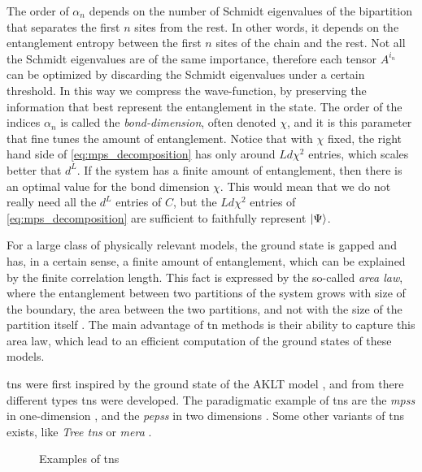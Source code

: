 The order of $\alpha_n$ depends on the number of Schmidt eigenvalues of the bipartition that separates the first $n$ sites from the rest.
In other words, it depends on the entanglement entropy between the first $n$ sites of the chain and the rest.
Not all the Schmidt eigenvalues are of the same importance, therefore each tensor $A^{i_n}$ can be optimized by discarding the Schmidt eigenvalues under a certain threshold.
In this way we compress the wave-function, by preserving the information that best represent the entanglement in the state.
The order of the indices $\alpha_n$ is called the \emph{bond-dimension}, often denoted $\chi$, and it is this parameter that fine tunes the amount of entanglement.
Notice that with $\chi$ fixed, the right hand side of \eqref{eq:mps_decomposition} has only around $L d \chi^2$ entries, which scales better that $d^L$.
If the system has a finite amount of entanglement, then there is an optimal value for the bond dimension $\chi$.
This would mean that we do not really need all the $d^L$ entries of $C$, but the $L d \chi^2$ entries of \eqref{eq:mps_decomposition} are sufficient to faithfully represent $\ket{\Psi}$.

For a large class of physically relevant models, the ground state is gapped and has, in a certain sense, a finite amount of entanglement, which can be explained by the finite correlation length.
This fact is expressed by the so-called \emph{area law}, where the entanglement between two partitions of the system grows with size of the boundary, the area between the two partitions, and not with the size of the partition itself \cite{vidal2003arealaw, calabrese2004qft, calabrese2009cft, srednicki1993area, plenio2005area}.
The main advantage of \ac{tn} methods is their ability to capture this area law, which lead to an efficient computation of the ground states of these models.

\Acp{tn} were first inspired by the ground state of the AKLT model \cite{affleck1987aklt}, and from there different types \acp{tn} were developed.
The paradigmatic example of \acp{tn} are the \emph{\acp{mps}} in one-dimension \cite{vidal2008simulation, schollwock2011dmrg}, and the \emph{\acp{peps}} in two dimensions \cite{verstraete2004algo, jordan2008ipeps}.
Some other variants of \acp{tn} exists, like \emph{Tree \acp{tn}} \cite{tagliacozzo2009tree, fannes1992trees} or \emph{\ac{mera}} \cite{evenbly2013mera, vidal2007entanglement, evenbly2009entanglement}.

\begin{figure}[t]
    \centering
    
    \caption{Examples of \acp{tn}}
\end{figure}

